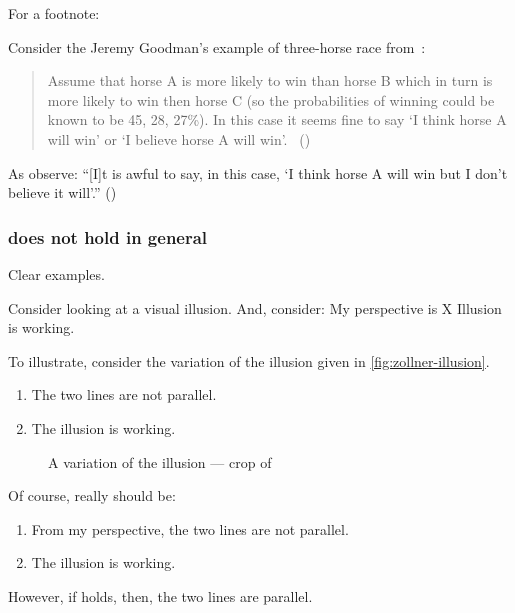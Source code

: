 \begin{note}
  \color{red}
  For a footnote:

  Consider the Jeremy Goodman's example of three-horse race from~\textcite{Hawthorne:2016wv}:
  \begin{quote}
    Assume that horse A is more likely to win than horse B which in turn is more likely to win then horse C (so the probabilities of winning could be known to be 45, 28, 27\%).
    In this case it seems ﬁne to say `I think horse A will win' or `I believe horse A will win'.%
    \mbox{ }\hfill\mbox{(\citeyear[1440]{Hawthorne:2016wv})}
  \end{quote}
  As \citeauthor{Hawthorne:2016wv} observe: ``[I]t is awful to say, in this case, `I think horse A will win but I don't believe it will'.''
  (\citeyear[1440, fn.17]{Hawthorne:2016wv})
\end{note}




\subsubsection{ does not hold in general}

\begin{note}
  Clear examples.

  Consider looking at a visual illusion.
  And, consider:
  My perspective is X
  Illusion is working.

  To illustrate, consider the variation of the \citeauthor{Zollner:1860vx} illusion given in \autoref{fig:zollner-illusion}.

  \begin{enumerate}
  \item
    The two lines are not parallel.
  \item
    The illusion is working.
  \end{enumerate}

  \begin{figure}[!h]
    \centering
    \def\svgwidth{\columnwidth}
    
    \caption{A variation of the \citeauthor{Zollner:1860vx} illusion --- crop of ~\textcite{Fibonacci:2007vj}}
    \label{fig:zollner-illusion}
  \end{figure}
\end{note}

\begin{note}
  Of course, really should be:

  \begin{enumerate}
  \item
    From my perspective, the two lines are not parallel.
  \item
    The illusion is working.
  \end{enumerate}

  However, if \ptivity{} holds, then, the two lines are parallel.
\end{note}


